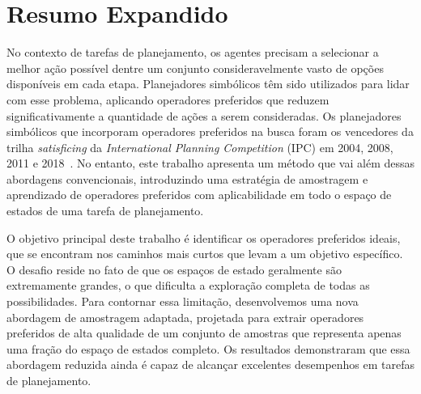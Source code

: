 \documentclass[ppgc,diss,english]{iiufrgs}
\begin{document}



\appendix

\chapter{Resumo Expandido}
\noindent

No contexto de tarefas de planejamento, os agentes precisam a selecionar a melhor ação possível dentre um conjunto consideravelmente vasto de opções disponíveis em cada etapa. Planejadores simbólicos têm sido utilizados para lidar com esse problema, aplicando operadores preferidos que reduzem significativamente a quantidade de ações a serem consideradas. Os planejadores simbólicos que incorporam operadores preferidos na busca foram os vencedores da trilha \emph{satisficing} da \emph{International Planning Competition} (IPC) em 2004, 2008, 2011 e 2018~\cite{Helmert/2006,Richter.lama.etal/2011,Richter.lama.etal/2011,Seipp-fast.etal/2018}.
No entanto, este trabalho apresenta um método que vai além dessas abordagens convencionais, introduzindo uma estratégia de amostragem e aprendizado de operadores preferidos com aplicabilidade em todo o espaço de estados de uma tarefa de planejamento.

O objetivo principal deste trabalho é identificar os operadores preferidos ideais, que se encontram nos caminhos mais curtos que levam a um objetivo específico. O desafio reside no fato de que os espaços de estado geralmente são extremamente grandes, o que dificulta a exploração completa de todas as possibilidades. Para contornar essa limitação, desenvolvemos uma nova abordagem de amostragem adaptada, projetada para extrair operadores preferidos de alta qualidade de um conjunto de amostras que representa apenas uma fração do espaço de estados completo. Os resultados demonstraram que essa abordagem reduzida ainda é capaz de alcançar excelentes desempenhos em tarefas de planejamento.

\end{document}
